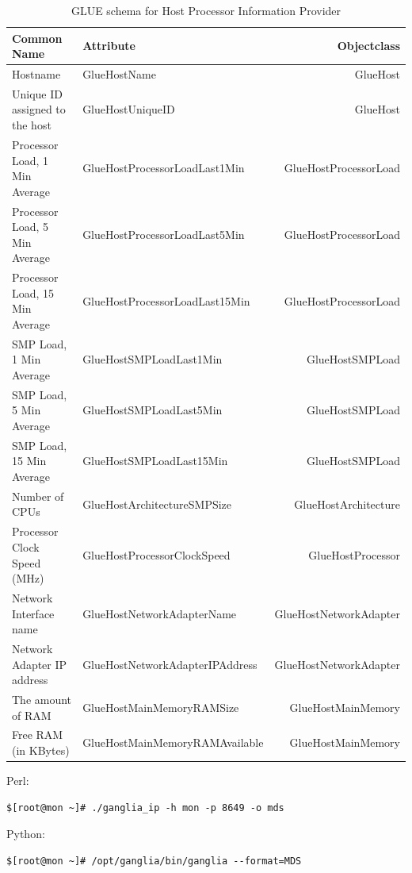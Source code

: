 \begin{table}[ht]
\begin{tabular}{ | l | l | r |}
\hline
{\bf Common Name} & {\bf Attribute} & {\bf Objectclass} \\ \hline
Hostname & GlueHostName & GlueHost \\ \hline
Unique ID assigned to the host & GlueHostUniqueID & GlueHost  \\ \hline
Processor Load, 1 Min Average  & GlueHostProcessorLoadLast1Min & GlueHostProcessorLoad \\ \hline
Processor Load, 5 Min Average  & GlueHostProcessorLoadLast5Min & GlueHostProcessorLoad \\ \hline
Processor Load, 15 Min Average  & GlueHostProcessorLoadLast15Min & GlueHostProcessorLoad \\ \hline
SMP Load, 1 Min Average  & GlueHostSMPLoadLast1Min & GlueHostSMPLoad \\ \hline
SMP Load, 5 Min Average  & GlueHostSMPLoadLast5Min & GlueHostSMPLoad \\ \hline
SMP Load, 15 Min Average  & GlueHostSMPLoadLast15Min & GlueHostSMPLoad \\ \hline
Number of CPUs  & GlueHostArchitectureSMPSize & GlueHostArchitecture \\ \hline
Processor Clock Speed (MHz)  & GlueHostProcessorClockSpeed & GlueHostProcessor \\ \hline
Network Interface name  & GlueHostNetworkAdapterName & GlueHostNetworkAdapter \\ \hline
Network Adapter IP address  & GlueHostNetworkAdapterIPAddress & GlueHostNetworkAdapter \\ \hline
The amount of RAM  & GlueHostMainMemoryRAMSize & GlueHostMainMemory \\ \hline
Free RAM (in KBytes)  & GlueHostMainMemoryRAMAvailable & GlueHostMainMemory \\ \hline
\end{tabular}
\caption{GLUE schema for Host Processor Information Provider}
\label{tab:tasks}
\end{table}

Perl:
\begin{lstlisting}
$[root@mon ~]# ./ganglia_ip -h mon -p 8649 -o mds
\end{lstlisting}

Python:
\begin{lstlisting}
$[root@mon ~]# /opt/ganglia/bin/ganglia --format=MDS
\end{lstlisting}

